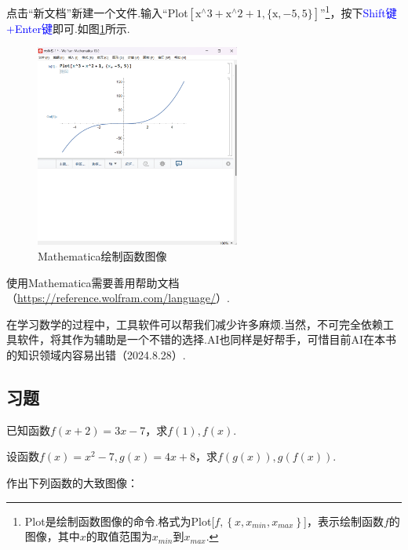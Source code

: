\documentclass[lang=cn,math=cm,chinesefont=nofont,11pt,scheme=chinese,twocol]{elegantbook}
\begin{document}
点击“新文档”新建一个文件.输入“Plot$\left[\text{x}^{\land}3+\text{x}^{\land}2+1,\{\text{x},-5,5\}\right]$”\footnote{Plot是绘制函数图像的命令.格式为Plot[$f,\left\{x,x_{min},x_{max}\right\}$]，表示绘制函数$f$的图像，其中$x$的取值范围为$x_{min}$到$x_{max}$.}，按下\textcolor{blue}{Shift键+Enter键}即可.如图\ref{img:mathematica2}所示.

\begin{figure}[h]
  \centering
  \includegraphics[width=0.6\textwidth]{image/mathematica2.png}
  \caption{Mathematica绘制函数图像}
  \label{img:mathematica2}
\end{figure}

使用Mathematica需要善用帮助文档（\href{https://reference.wolfram.com/language/}{https://reference.wolfram.com/language/}）.

在学习数学的过程中，工具软件可以帮我们减少许多麻烦.当然，不可完全依赖工具软件，将其作为辅助是一个不错的选择.AI也同样是好帮手，可惜目前AI在本书的知识领域内容易出错（2024.8.28）.

\subsection{习题}

\begin{exercise}\label{2017RJB.P94.8.changed}
  已知函数$f(x+2)=3x-7$，求$f(1),f(x)$.
\end{exercise}

\begin{exercise}
  设函数$f(x)=x^2-7,g(x)=4x+8$，求$f(g(x)),g(f(x))$.
\end{exercise}

\begin{exercise}
  作出下列函数的大致图像：
\end{exercise}
\end{document}
